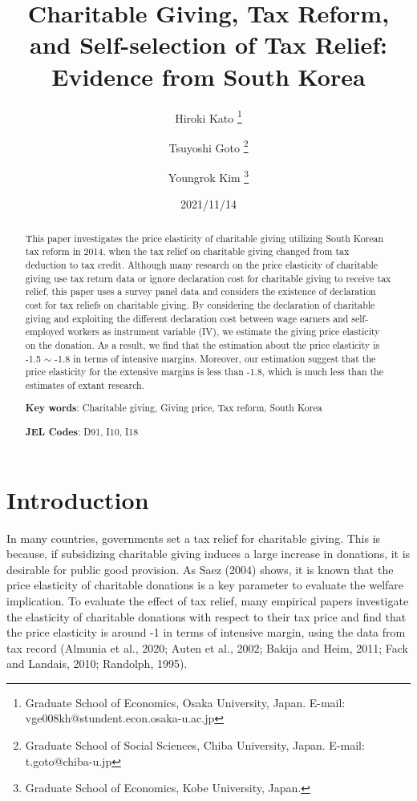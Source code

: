 \documentclass[
  11pt,
  a4paper,
]{article}
\title{Charitable Giving, Tax Reform, and Self-selection of Tax Relief: Evidence from South Korea  }
\author{
    Hiroki Kato
  \thanks{Graduate School of Economics, Osaka University, Japan. E-mail: vge008kh@stundent.econ.osaka-u.ac.jp  }
  \and
    Tsuyoshi Goto
  \thanks{Graduate School of Social Sciences, Chiba University, Japan. E-mail: t.goto@chiba-u.jp  }
  \and
    Youngrok Kim
  \thanks{Graduate School of Economics, Kobe University, Japan.  }
  \and
  }
\date{2021/11/14}
\begin{document}
\begin{spacing}{1}
  \maketitle
\end{spacing}
\begin{spacing}{1}
  \begin{abstract}
    This paper investigates the price elasticity of charitable giving utilizing South Korean tax reform in 2014, when the tax relief on charitable giving changed from tax deduction to tax credit. Although many research on the price elasticity of charitable giving use tax return data or ignore declaration cost for charitable giving to receive tax relief, this paper uses a survey panel data and considers the existence of declaration cost for tax reliefs on charitable giving.
    By considering the declaration of charitable giving and exploiting the different declaration cost between wage earners and self-employed workers as instrument variable (IV), we estimate the giving price elasticity on the donation. As a result, we find that the estimation about the price elasticity is -1.5 \(\sim\) -1.8 in terms of intensive margins.
    Moreover, our estimation suggest that the price elasticity for the extensive margins is less than -1.8, which is much less than the estimates of extant research.
    
            \noindent
    \textbf{Key words}: Charitable giving, Giving price, Tax reform, South Korea
        
        \noindent
    \textbf{JEL Codes}: D91, I10, I18
        
  \end{abstract}
\end{spacing}

\hypertarget{introduction}{%
\section{Introduction}\label{introduction}}

In many countries, governments set a tax relief for charitable giving. This is because, if subsidizing charitable giving induces a large increase in donations, it is desirable for public good provision. As Saez (2004) shows, it is known that the price elasticity of charitable donations is a key parameter to evaluate the welfare implication. To evaluate the effect of tax relief, many empirical papers investigate the elasticity of charitable donations with respect to their tax price and find that the price elasticity is around -1 in terms of intensive margin, using the data from tax record (Almunia et al., 2020; Auten et al., 2002; Bakija and Heim, 2011; Fack and Landais, 2010; Randolph, 1995).
\end{document}
